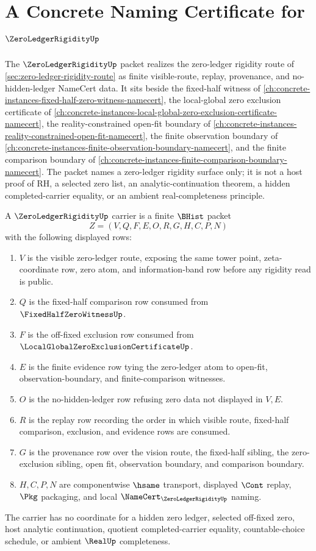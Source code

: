 \chapter{A Concrete Naming Certificate for $\ZeroLedgerRigidityUp$}
\label{ch:concrete-instances-zero-ledger-rigidity-namecert}

The $\ZeroLedgerRigidityUp$ packet realizes the zero-ledger rigidity route of \autoref{sec:zero-ledger-rigidity-route} as finite visible-route, replay, provenance, and no-hidden-ledger NameCert data. It sits beside the fixed-half witness of \autoref{ch:concrete-instances-fixed-half-zero-witness-namecert}, the local-global zero exclusion certificate of \autoref{ch:concrete-instances-local-global-zero-exclusion-certificate-namecert}, the reality-constrained open-fit boundary of \autoref{ch:concrete-instances-reality-constrained-open-fit-namecert}, the finite observation boundary of \autoref{ch:concrete-instances-finite-observation-boundary-namecert}, and the finite comparison boundary of \autoref{ch:concrete-instances-finite-comparison-boundary-namecert}. The packet names a zero-ledger rigidity surface only; it is not a host proof of RH, a selected zero list, an analytic-continuation theorem, a hidden completed-carrier equality, or an ambient real-completeness principle.

\begin{definition}
\label{def:zero-ledger-rigidity-carrier}
A $\ZeroLedgerRigidityUp$ carrier is a finite $\BHist$ packet
$$
Z=(V,Q,F,E,O,R,G,H,C,P,N)
$$
with the following displayed rows:
\begin{enumerate}
\item $V$ is the visible zero-ledger route, exposing the same tower point, zeta-coordinate row, zero atom, and information-band row before any rigidity read is public.
\item $Q$ is the fixed-half comparison row consumed from $\FixedHalfZeroWitnessUp$.
\item $F$ is the off-fixed exclusion row consumed from $\LocalGlobalZeroExclusionCertificateUp$.
\item $E$ is the finite evidence row tying the zero-ledger atom to open-fit, observation-boundary, and finite-comparison witnesses.
\item $O$ is the no-hidden-ledger row refusing zero data not displayed in $V,E$.
\item $R$ is the replay row recording the order in which visible route, fixed-half comparison, exclusion, and evidence rows are consumed.
\item $G$ is the provenance row over the vision route, the fixed-half sibling, the zero-exclusion sibling, open fit, observation boundary, and comparison boundary.
\item $H,C,P,N$ are componentwise $\hsame$ transport, displayed $\Cont$ replay, $\Pkg$ packaging, and local $\NameCert_{\ZeroLedgerRigidityUp}$ naming.
\end{enumerate}
The carrier has no coordinate for a hidden zero ledger, selected off-fixed zero, host analytic continuation, quotient completed-carrier equality, countable-choice schedule, or ambient $\RealUp$ completeness.
\end{definition}

